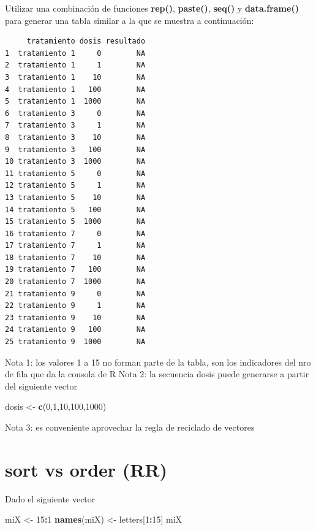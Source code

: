 \documentclass[]{book}
\newenvironment{Shaded}{\begin{snugshade}}{\end{snugshade}}
\newcommand{\DecValTok}[1]{\textcolor[rgb]{0.00,0.00,0.81}{#1}}
\newcommand{\KeywordTok}[1]{\textcolor[rgb]{0.13,0.29,0.53}{\textbf{#1}}}
\newcommand{\NormalTok}[1]{#1}
\newcommand{\OperatorTok}[1]{\textcolor[rgb]{0.81,0.36,0.00}{\textbf{#1}}}
\newcommand{\StringTok}[1]{\textcolor[rgb]{0.31,0.60,0.02}{#1}}
\begin{document}
Utilizar una combinación de funciones \textbf{rep()}, \textbf{paste()}, \textbf{seq()} y \textbf{data.frame()} para generar una tabla similar a la que se muestra a continuación:

\begin{verbatim}
     tratamiento dosis resultado
1  tratamiento 1     0        NA
2  tratamiento 1     1        NA
3  tratamiento 1    10        NA
4  tratamiento 1   100        NA
5  tratamiento 1  1000        NA
6  tratamiento 3     0        NA
7  tratamiento 3     1        NA
8  tratamiento 3    10        NA
9  tratamiento 3   100        NA
10 tratamiento 3  1000        NA
11 tratamiento 5     0        NA
12 tratamiento 5     1        NA
13 tratamiento 5    10        NA
14 tratamiento 5   100        NA
15 tratamiento 5  1000        NA
16 tratamiento 7     0        NA
17 tratamiento 7     1        NA
18 tratamiento 7    10        NA
19 tratamiento 7   100        NA
20 tratamiento 7  1000        NA
21 tratamiento 9     0        NA
22 tratamiento 9     1        NA
23 tratamiento 9    10        NA
24 tratamiento 9   100        NA
25 tratamiento 9  1000        NA
\end{verbatim}

Nota 1: los valores 1 a 15 no forman parte de la tabla, son los indicadores del nro de fila que da la consola de R
Nota 2: la secuencia dosis puede generarse a partir del siguiente vector

\begin{Shaded}
\begin{Highlighting}[]
\NormalTok{dosis <-}\StringTok{ }\KeywordTok{c}\NormalTok{(}\DecValTok{0}\NormalTok{,}\DecValTok{1}\NormalTok{,}\DecValTok{10}\NormalTok{,}\DecValTok{100}\NormalTok{,}\DecValTok{1000}\NormalTok{)}
\end{Highlighting}
\end{Shaded}

Nota 3: es conveniente aprovechar la regla de reciclado de vectores

\hypertarget{sort-vs-order-rr}{%
\section{sort vs order (RR)}\label{sort-vs-order-rr}}

Dado el siguiente vector

\begin{Shaded}
\begin{Highlighting}[]
\NormalTok{miX <-}\StringTok{ }\DecValTok{15}\OperatorTok{:}\DecValTok{1}
\KeywordTok{names}\NormalTok{(miX) <-}\StringTok{ }\NormalTok{letters[}\DecValTok{1}\OperatorTok{:}\DecValTok{15}\NormalTok{]}
\NormalTok{miX }
\end{Highlighting}
\end{Shaded}
\end{document}

